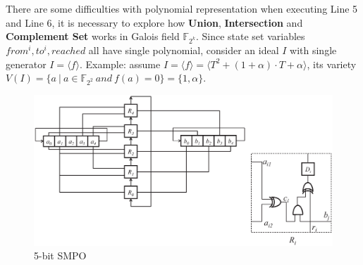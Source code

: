 There are some difficulties with polynomial representation when executing Line 5 and Line 6, it is necessary to explore
how \textbf{Union}, \textbf{Intersection} and \textbf{Complement Set} works in Galois field $\mathbb{F}_{2^k}$. Since
state set variables $from^i, to^i, reached$ all have single polynomial, consider an ideal $I$ with single generator $I = \langle f\rangle $.
Example: assume $I = \langle f\rangle  = \langle T^2 + (1+\alpha)\cdot T+\alpha\rangle $, its variety $V(I) = \{a\ |\ a \in \mathbb{F}_{2^2}\ and\ f(a) = 0\} = \{1, \alpha\}$.


\begin{figure}[tb]
\begin{center}
\includegraphics[width=\textwidth]{./mySMPO.eps}
\end{center}
\caption{5-bit SMPO}
\label{fig:SMPO}
\end{figure}

